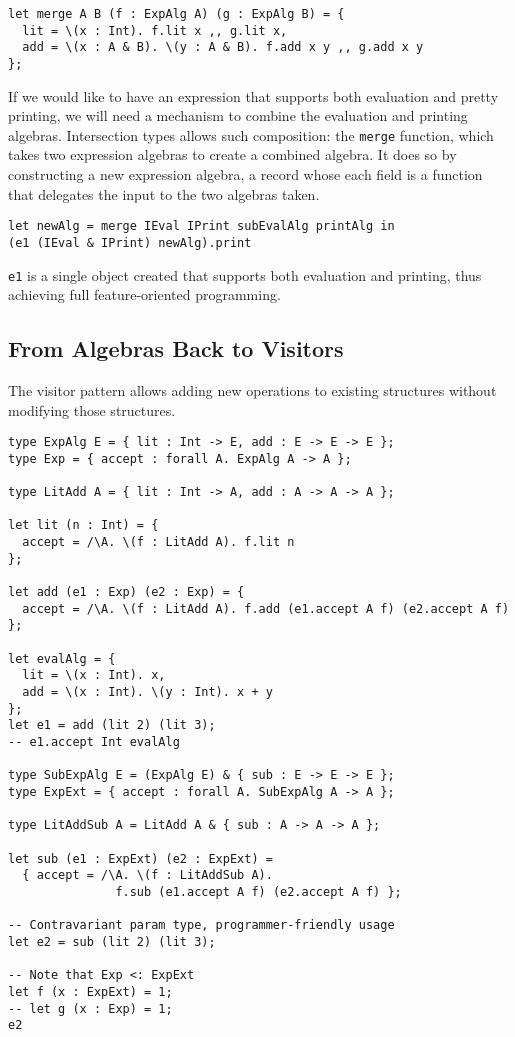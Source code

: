 \begin{verbatim}
let merge A B (f : ExpAlg A) (g : ExpAlg B) = {
  lit = \(x : Int). f.lit x ,, g.lit x,
  add = \(x : A & B). \(y : A & B). f.add x y ,, g.add x y
};
\end{verbatim}




If we would like to have an expression that supports both evaluation and pretty
printing, we will need a mechanism to combine the evaluation and printing
algebras. Intersection types allows such composition: the \lstinline{merge}
function, which takes two expression algebras to create a combined algebra. It
does so by constructing a new expression algebra, a record whose each field is a
function that delegates the input to the two algebras taken.

\begin{verbatim}
let newAlg = merge IEval IPrint subEvalAlg printAlg in
(e1 (IEval & IPrint) newAlg).print
\end{verbatim}





\lstinline{e1} is a single object created that supports both evaluation and
printing, thus achieving full feature-oriented programming.

\subsection{From Algebras Back to Visitors}

The visitor pattern allows adding new operations to existing structures without
modifying those structures.

\begin{verbatim}
type ExpAlg E = { lit : Int -> E, add : E -> E -> E };
type Exp = { accept : forall A. ExpAlg A -> A };

type LitAdd A = { lit : Int -> A, add : A -> A -> A };

let lit (n : Int) = {
  accept = /\A. \(f : LitAdd A). f.lit n
};

let add (e1 : Exp) (e2 : Exp) = {
  accept = /\A. \(f : LitAdd A). f.add (e1.accept A f) (e2.accept A f)
};

let evalAlg = {
  lit = \(x : Int). x,
  add = \(x : Int). \(y : Int). x + y
};
let e1 = add (lit 2) (lit 3);
-- e1.accept Int evalAlg

type SubExpAlg E = (ExpAlg E) & { sub : E -> E -> E };
type ExpExt = { accept : forall A. SubExpAlg A -> A };

type LitAddSub A = LitAdd A & { sub : A -> A -> A };

let sub (e1 : ExpExt) (e2 : ExpExt) =
  { accept = /\A. \(f : LitAddSub A).
               f.sub (e1.accept A f) (e2.accept A f) };

-- Contravariant param type, programmer-friendly usage
let e2 = sub (lit 2) (lit 3);

-- Note that Exp <: ExpExt
let f (x : ExpExt) = 1;
-- let g (x : Exp) = 1;
e2
\end{verbatim}


